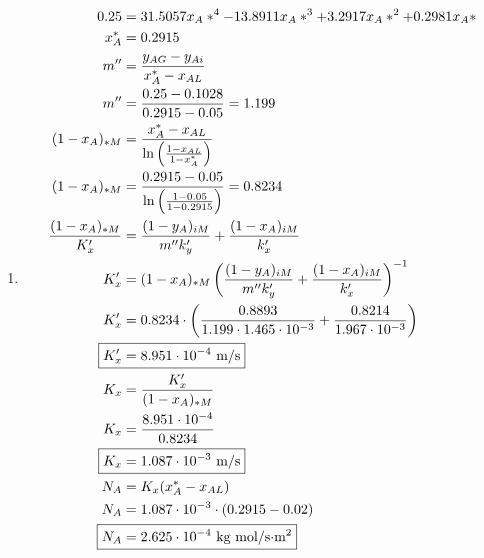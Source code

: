 \documentclass[12pt]{article}
\begin{document}
\begin{enumerate}
\begin{enumerate}
        \item 
        \begin{align*}
            0.25 &= 31.5057 x_A*^4 - 13.8911 x_A*^3 + 3.2917 x_A*^2 + 0.2981 x_A* \\ 
            x_A^* &= 0.2915 \\
            m'' &= \frac{y_{AG} - y_{Ai}}{x_A^* - x_{AL}} \\
            m'' &= \frac{0.25 - 0.1028}{0.2915 - 0.05} = 1.199 \\
            (1 - x_{A})_{*M} &= \frac{x_A^* - x_{AL}}{\ln\left(\frac{1 - x_{AL}}{1 - x_A^*}\right)} \\
            (1 - x_{A})_{*M} &= \frac{0.2915 - 0.05}{\ln\left(\frac{1 - 0.05}{1 - 0.2915}\right)} = 0.8234 \\
            \frac{(1 - x_{A})_{*M}}{K_x'} &= \frac{(1 - y_{A})_{iM}}{m'' k_y'} + \frac{(1 - x_{A})_{iM}}{k_x'} \\
            K_x' &= (1 - x_{A})_{*M} \left(\frac{(1 - y_{A})_{iM}}{m'' k_y'} + \frac{(1 - x_{A})_{iM}}{k_x'}\right)^{-1} \\
            K_x' &= 0.8234 \cdot \left(\frac{0.8893}{1.199 \cdot 1.465 \cdot 10^{-3}} + \frac{0.8214}{1.967 \cdot 10^{-3}}\right) \\
            \Aboxed{K_x' &= 8.951 \cdot 10^{-4} \text{ m/s}} \\
            K_x &= \frac{K_x'}{(1 - x_{A})_{*M}} \\
            K_x &= \frac{8.951 \cdot 10^{-4}}{0.8234} \\
            \Aboxed{K_x &= 1.087 \cdot 10^{-3} \text{ m/s}} \\
            N_A &= K_x (x_A^* - x_{AL}) \\
            N_A &= 1.087 \cdot 10^{-3} \cdot (0.2915 - 0.02) \\
            \Aboxed{N_A &= 2.625 \cdot 10^{-4} \text{ kg mol/s$\cdot$m$^2$}}
        \end{align*}
    \end{enumerate}


\end{enumerate}
\end{document}
